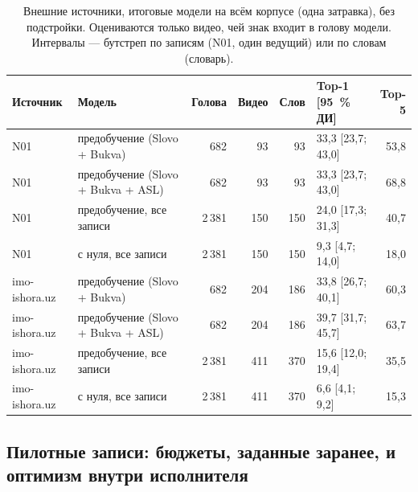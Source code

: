 \documentclass[a4paper,fleqn]{cas-dc}
\begin{document}
\begin{table}[t]
\caption{Внешние источники, итоговые модели на всём корпусе (одна затравка), без подстройки. Оцениваются только видео, чей знак входит в голову модели. Интервалы — бутстреп по записям (N01, один ведущий) или по словам (словарь).}\label{tab:external}
\footnotesize
\centering
\begin{tabular}{llrrrlr}
\toprule
\textbf{Источник} & \textbf{Модель} & \textbf{Голова} & \textbf{Видео} & \textbf{Слов} & \textbf{Top-1 [95~\% ДИ]} & \textbf{Top-5} \\
\midrule
N01 & предобучение (Slovo + Bukva) & 682 & 93 & 93 & 33,3 [23,7; 43,0] & 53,8 \\
N01 & предобучение (Slovo + Bukva + ASL) & 682 & 93 & 93 & 33,3 [23,7; 43,0] & 68,8 \\
N01 & предобучение, все записи & 2\,381 & 150 & 150 & 24,0 [17,3; 31,3] & 40,7 \\
N01 & с нуля, все записи & 2\,381 & 150 & 150 & 9,3 [4,7; 14,0] & 18,0 \\
imo-ishora.uz & предобучение (Slovo + Bukva) & 682 & 204 & 186 & 33,8 [26,7; 40,1] & 60,3 \\
imo-ishora.uz & предобучение (Slovo + Bukva + ASL) & 682 & 204 & 186 & 39,7 [31,7; 45,7] & 63,7 \\
imo-ishora.uz & предобучение, все записи & 2\,381 & 411 & 370 & 15,6 [12,0; 19,4] & 35,5 \\
imo-ishora.uz & с нуля, все записи & 2\,381 & 411 & 370 & 6,6 [4,1; 9,2] & 15,3 \\
\bottomrule
\end{tabular}
\end{table}

\hypertarget{ux43fux438ux43bux43eux442ux43dux44bux435-ux437ux430ux43fux438ux441ux438-ux431ux44eux434ux436ux435ux442ux44b-ux437ux430ux434ux430ux43dux43dux44bux435-ux437ux430ux440ux430ux43dux435ux435-ux438-ux43eux43fux442ux438ux43cux438ux437ux43c-ux432ux43dux443ux442ux440ux438-ux438ux441ux43fux43eux43bux43dux438ux442ux435ux43bux44f}{%
\subsection{Пилотные записи: бюджеты, заданные заранее, и оптимизм внутри исполнителя}\label{ux43fux438ux43bux43eux442ux43dux44bux435-ux437ux430ux43fux438ux441ux438-ux431ux44eux434ux436ux435ux442ux44b-ux437ux430ux434ux430ux43dux43dux44bux435-ux437ux430ux440ux430ux43dux435ux435-ux438-ux43eux43fux442ux438ux43cux438ux437ux43c-ux432ux43dux443ux442ux440ux438-ux438ux441ux43fux43eux43bux43dux438ux442ux435ux43bux44f}}
\end{document}
